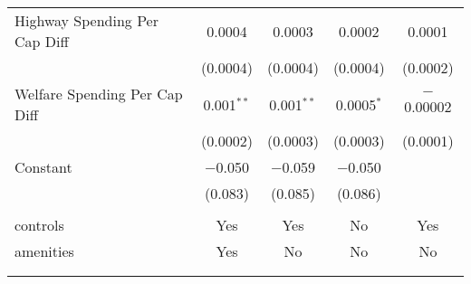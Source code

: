 \begin{table}[!htbp]
\begin{tabular}{@{\extracolsep{5pt}}lcccc}
  Highway Spending Per Cap Diff & 0.0004 & 0.0003 & 0.0002 & 0.0001 \\ 
  & (0.0004) & (0.0004) & (0.0004) & (0.0002) \\ 
  Welfare Spending Per Cap Diff & 0.001$^{**}$ & 0.001$^{**}$ & 0.0005$^{*}$ & $-$0.00002 \\ 
  & (0.0002) & (0.0003) & (0.0003) & (0.0001) \\ 
  Constant & $-$0.050 & $-$0.059 & $-$0.050 &  \\ 
  & (0.083) & (0.085) & (0.086) &  \\ 
 \hline \\[-1.8ex] 
controls & Yes & Yes & No & Yes \\ 
amenities & Yes & No & No & No \\ 
\hline \\[-1.8ex] 
\hline 
\hline \\[-1.8ex] 
\end{tabular} 
\end{table} 
